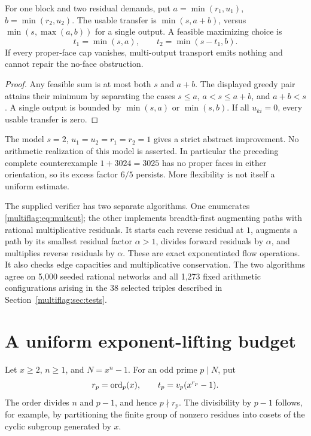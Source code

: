 \begin{proposition}
For one block and two residual demands, put \(a=\min(r_1,u_1)\), \(b=\min(r_2,u_2)\). The usable transfer is \(\min(s,a+b)\), versus \(\min(s,\max(a,b))\) for a single output. A feasible maximizing choice is
\[
 t_1=\min(s,a),\qquad t_2=\min(s-t_1,b).
\]
If every proper-face cap vanishes, multi-output transport emits nothing and cannot repair the no-face obstruction.
\end{proposition}
\begin{proof}
Any feasible sum is at most both \(s\) and \(a+b\). The displayed greedy pair attains their minimum by separating the cases \(s\le a\), \(a<s\le a+b\), and \(a+b<s\). A single output is bounded by \(\min(s,a)\) or \(\min(s,b)\). If all \(u_{ki}=0\), every usable transfer is zero.
\end{proof}
The model \(s=2\), \(u_1=u_2=r_1=r_2=1\) gives a strict abstract improvement. No arithmetic realization of this model is asserted. In particular the preceding complete counterexample \(1+3024=3025\) has no proper faces in either orientation, so its excess factor \(6/5\) persists. More flexibility is not itself a uniform estimate.

The supplied verifier has two separate algorithms. One enumerates \eqref{multiflag:eq:multcut}; the other implements breadth-first augmenting paths with rational multiplicative residuals. It starts each reverse residual at \(1\), augments a path by its smallest residual factor \(\alpha>1\), divides forward residuals by \(\alpha\), and multiplies reverse residuals by \(\alpha\). These are exact exponentiated flow operations. It also checks edge capacities and multiplicative conservation. The two algorithms agree on 5,000 seeded rational networks and all 1,273 fixed arithmetic configurations arising in the 38 selected triples described in Section~\ref{multiflag:sec:tests}.

\section{A uniform exponent-lifting budget}\label{multiflag:sec:lift}
Let \(x\ge2\), \(n\ge1\), and \(N=x^n-1\). For an odd prime \(p\mid N\), put
\[
 r_p=\operatorname{ord}_p(x),\qquad t_p=v_p(x^{r_p}-1).
\]
The order divides \(n\) and \(p-1\), and hence \(p\nmid r_p\). The divisibility by \(p-1\) follows, for example, by partitioning the finite group of nonzero residues into cosets of the cyclic subgroup generated by \(x\).

